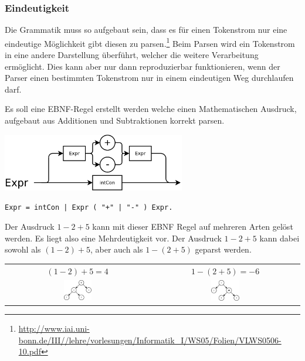 \newpage

\subsubsection{Eindeutigkeit}

Die Grammatik muss so aufgebaut sein, dass es für einen Tokenstrom nur eine eindeutige Möglichkeit gibt diesen zu parsen.\footnote{\url{http://www.iai.uni-bonn.de/III//lehre/vorlesungen/Informatik_I/WS05/Folien/VLWS0506-10.pdf}} Beim Parsen wird ein Tokenstrom in eine andere Darstellung \"uberf\"uhrt, welcher die weitere Verarbeitung erm\"oglicht. Dies kann aber nur dann reproduzierbar funktionieren, wenn der Parser einen bestimmten Tokenstrom nur in einem eindeutigen Weg durchlaufen darf.


Es soll eine EBNF-Regel erstellt werden welche einen Mathematischen Ausdruck, aufgebaut aus Additionen und Subtraktionen korrekt parsen.

\includegraphics[width=0.6\textwidth]{./media/images/compiler/ambiguity_wrong.png}

\begin{lstlisting}[language=EBNF]
Expr = intCon | Expr ( "+" | "-" ) Expr.
\end{lstlisting}

Der Ausdruck $1-2+5$ kann mit dieser EBNF Regel auf mehreren Arten gelöst werden. Es liegt also eine Mehrdeutigkeit vor. Der Ausdruck $1-2+5$ kann dabei sowohl als $(1-2)+5$, aber auch als $1-(2+5)$ geparst werden.

\begin{tabular}{ c | c }
  $(1-2)+5=4$ & 
  $1-(2+5)=-6$ \\
  \includegraphics[width=0.2\textwidth]{./media/images/compiler/ambiguity_tree_correct.png} & 
  \includegraphics[width=0.2\textwidth]{./media/images/compiler/ambiguity_tree_wrong.png} \\
\end{tabular}

